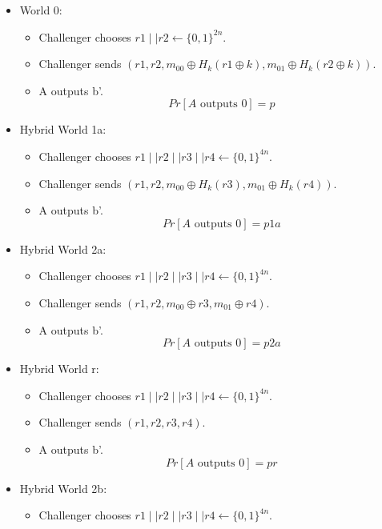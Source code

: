 \documentclass{article}
\begin{document}
\begin{itemize}
        \item World 0: 
        \begin{itemize}
            \item Challenger chooses $r1 \mid \mid r2\leftarrow\{0,1\}^{2n}$.
            \item Challenger sends $(r1,r2,m_{00}\oplus H_{k}(r1\oplus k),m_{01}\oplus H_{k}(r2\oplus k))$.
            \item A outputs b'.
            \[Pr[A \text{ outputs }0]=p\]
        \end{itemize}
        \item Hybrid World 1a:
        \begin{itemize}
            \item Challenger chooses $r1 \mid \mid r2\mid \mid r3\mid \mid r4\leftarrow\{0,1\}^{4n}$.
            \item Challenger sends $(r1,r2,m_{00}\oplus H_{k}(r3),m_{01}\oplus H_{k}(r4))$.
            \item A outputs b'.
            \[Pr[A \text{ outputs }0]=p1a\]
        \end{itemize}
        \item Hybrid World 2a:
        \begin{itemize}
            \item Challenger chooses $r1 \mid \mid r2\mid \mid r3\mid \mid r4\leftarrow\{0,1\}^{4n}$.
            \item Challenger sends $(r1,r2,m_{00}\oplus r3,m_{01}\oplus r4)$.
            \item A outputs b'.
            \[Pr[A \text{ outputs }0]=p2a\]
        \end{itemize}
        \item Hybrid World r:
        \begin{itemize}
            \item Challenger chooses $r1 \mid \mid r2\mid \mid r3\mid \mid r4\leftarrow\{0,1\}^{4n}$.
            \item Challenger sends $(r1,r2,r3,r4)$.
            \item A outputs b'.
            \[Pr[A \text{ outputs }0]=pr\]
        \end{itemize}
        \item Hybrid World 2b:
        \begin{itemize}
            \item Challenger chooses $r1 \mid \mid r2\mid \mid r3\mid \mid r4\leftarrow\{0,1\}^{4n}$.

\end{itemize}
\end{itemize}
\end{document}
